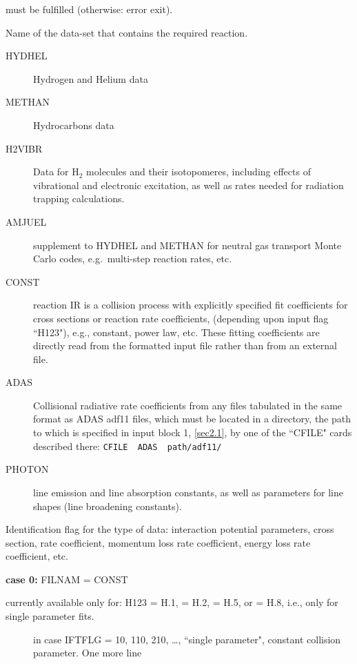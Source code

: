 \begin{description}
        must be fulfilled (otherwise: error exit).
  \item[FILNAM] Name of the data-set that contains the required reaction.
        \begin{description}
          \item[HYDHEL] Hydrogen and Helium data \cite{kn:Janev}
          \item[METHAN]
                Hydrocarbons data \cite{kn:Ehrhardt}
          \item[H2VIBR] Data for H$_2$ molecules and
                their isotopomeres, including effects of vibrational and electronic excitation,
                as well as rates needed for radiation trapping calculations.
          \item[AMJUEL] supplement to HYDHEL and METHAN for neutral gas transport Monte
                Carlo codes, e.g.\ multi-step reaction rates, etc.
          \item[CONST] reaction IR is
                a collision process with explicitly specified fit coefficients for cross
                sections or reaction rate coefficients, (depending upon input flag ``H123"),
                e.g., constant, power law, etc. These fitting coefficients are directly read
                from the formatted input file rather than from an external file.
          \item[ADAS] Collisional radiative rate coefficients from any files tabulated in
                the same format as \ac{ADAS} adf11 files, which must be located in a directory,
                the path to which is specified in input block 1, \cref{sec2.1}, by one of the
                ``CFILE" cards described there:   \lstinline|CFILE  ADAS  path/adf11/|
          \item[PHOTON]  line
                emission and line absorption constants, as well as parameters for line shapes
                (line broadening constants).

        \end{description}
  \item[H123] Identification flag for the type of data: interaction potential
        parameters, cross section, rate coefficient, momentum loss rate coefficient,
        energy loss rate coefficient, etc.

        \textbf{case 0:} FILNAM = CONST

        currently available only for: H123 = H.1, = H.2, = H.5, or = H.8, i.e., only
        for single parameter fits.
        \begin{description}
          \item[] in case IFTFLG = 10, 110, 210, \dots, ``single parameter", constant
                collision parameter.
                One more line


\end{description}
\end{description}
